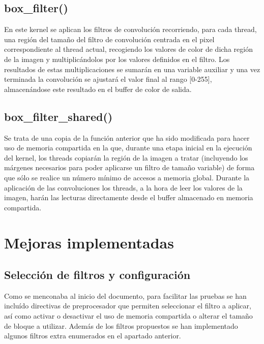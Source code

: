 \documentclass[10pt,oneside,a4paper]{article}
\begin{document}
\subsection{box\_filter()}
En este kernel se aplican los filtros de convolución recorriendo, para cada thread, una región del tamaño del filtro de convolución centrada en el pixel correspondiente al thread actual, recogiendo los valores de color de dicha región de la imagen y multiplicándolos por los valores definidos en el filtro. Los resultados de estas multiplicaciones se sumarán en una variable auxiliar y una vez terminada la convolución se ajustará el valor final al rango [0-255], almacenándose este resultado en el buffer de color de salida.

\subsection{box\_filter\_shared()}
Se trata de una copia de la función anterior que ha sido modificada para hacer uso de memoria compartida en la que, durante una etapa inicial en la ejecución del kernel, los threads copiarán la región de la imagen a tratar (incluyendo los márgenes necesarios para poder aplicarse un filtro de tamaño variable) de forma que sólo se realice un número mínimo de accesos a memoria global. Durante la aplicación de las convoluciones los threads, a la hora de leer los valores de la imagen, harán las lecturas directamente desde el buffer almacenado en memoria compartida.

\section{Mejoras implementadas}
\subsection{Selección de filtros y configuración}
Como se menconaba al inicio del documento, para facilitar las pruebas se han incluído directivas de preprocesador que permiten seleccionar el filtro a aplicar, así como activar o desactivar el uso de memoria compartida o alterar el tamaño de bloque a utilizar. Además de los filtros propuestos se han implementado algunos filtros extra enumerados en el apartado anterior.
\end{document}
